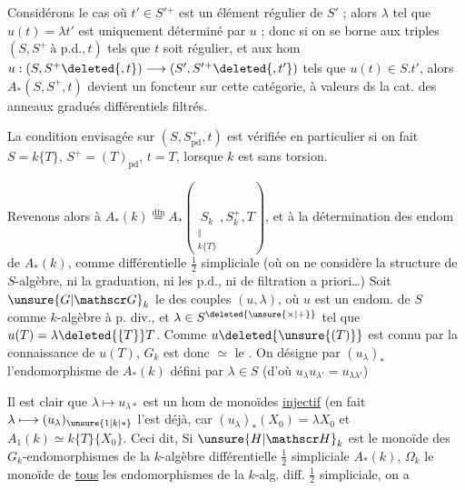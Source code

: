 Considérons le cas où $t'\in S'{}^+$ est un élément régulier de $S'$ ; alors $\lambda$ tel que $u(t)=\lambda t'$ est uniquement déterminé par $u$ ; donc si on se borne aux
triples $(S,S^+\ \text{à p.d.},t)$ tels que $t$ soit régulier, et aux hom $u:(S,S^+\deleted{,t})\longrightarrow(S',S'{}^+\deleted{,t'})$ tels que $u(t)\in S.t'$, alors $A_\ast(S,S^+,t)$ devient un foncteur sur cette catégorie, à valeurs ds la cat. des
 anneaux gradués  différentiels  filtrés.

La condition envisagée sur $(S,S^+_{\mathrm{pd}},t)$ est vérifiée en particulier si on fait $S=k\{T\}$, $S^+=(T)_{\mathrm{pd}}$, $t=T$, lorsque $k$ est sans torsion.

Revenons alors à $\displaystyle A_\ast(k)\overset{\mathrm{dfn}}{=}A_\ast(\underset{\substack{\Vert\\k\{T\}}}{S_k},S_k^+,T)$, et à la détermination des endom de $A_\ast(k)$, comme   différentielle $\frac12$ simpliciale (où on ne considère  la structure de $S$-algèbre, ni la graduation, ni les p.d., ni de filtration a priori\ldots)
 Soit $\unsure{G|\mathscr G}_k$ le   des couples $(u,\lambda)$, où $u$ est un endom. de $S$ comme $k$-algèbre à p. div., et $\lambda\in S^{\deleted{\unsure{\times|+}}}$ tel que $u(T)=\lambda\deleted{\{T\}}T$.
Comme $u\deleted{\unsure{(T)}}$ est connu par la connaissance de $u(T)$,
$G_k$ est donc $\simeq$ le  
 . On désigne par $(u_\lambda)_\ast$ l'endomorphisme de $A_\ast(k)$ défini par $\lambda\in S$ (d'où $u_\lambda u_{\lambda'}=u_{\lambda\lambda'}$)

Il est clair que $\lambda\longmapsto u_{\lambda\ast}$ est un hom de monoïdes \uline{injectif} (en fait $\lambda\longmapsto(u_\lambda)_{\unsure{1|k|\ast}}$ l'est déjà, car $(u_\lambda)_\ast(X_0)=\lambda X_0$ et $A_1(k)\simeq k\{T\}\{X_0\}$. Ceci dit,
Si $\unsure{H|\mathscr H}_k$ est le monoïde des $G_k$-endomorphismes de la $k$-algèbre différentielle $\frac12$ simpliciale $A_\ast(k)$,  $\Omega_k$ le monoïde de \uline{tous} les endomorphismes de la $k$-alg. diff. $\frac12$ simpliciale, on a
